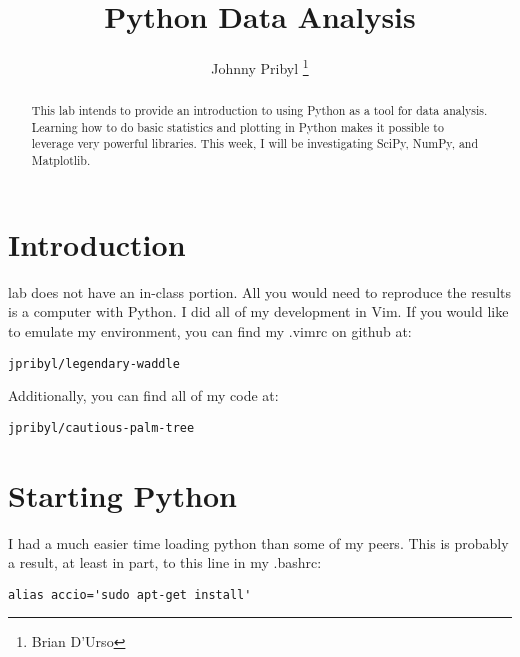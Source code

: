 \documentclass[journal, a4paper]{IEEEtran}
\begin{document}
\title{Python Data Analysis}
\author{Johnny Pribyl
		\thanks{Brian D'Urso}}
	\maketitle

\begin{abstract}
		This lab intends to provide an introduction to using Python as a tool
		for data analysis. Learning how to do basic statistics and plotting in
		Python makes it possible to leverage very powerful libraries. This week,
		I will be investigating SciPy, NumPy, and Matplotlib.
\end{abstract}

\section{Introduction}

	 lab does not have an in-class portion. All you would need
	to reproduce the results is a computer with Python. I did all of my
	development in Vim. If you would like to emulate my environment, you can
	find my .vimrc on github at:

\begin{lstlisting}
jpribyl/legendary-waddle 
\end{lstlisting}

Additionally, you can find all of my code at:
\begin{lstlisting}
jpribyl/cautious-palm-tree
\end{lstlisting}

\section{Starting Python}

	I had a much easier time loading python than some of my peers. This is
	probably a result, at least in part, to this line in my .bashrc:

\begin{lstlisting}
alias accio='sudo apt-get install'
\end{lstlisting}
\end{document}
